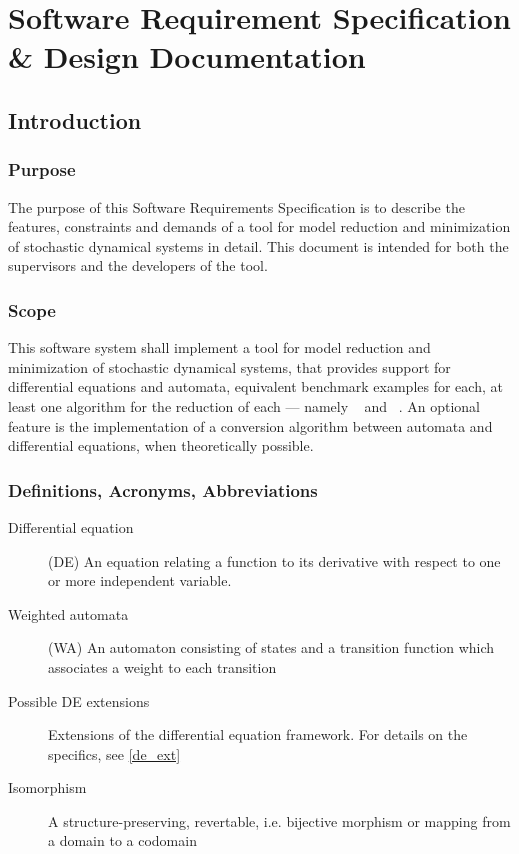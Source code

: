 \chapter{Software Requirement Specification \& Design Documentation}
    \section{Introduction}
        \subsection{Purpose}
                The purpose of this Software Requirements Specification is to describe the features, constraints and demands of a tool for model reduction and minimization of stochastic dynamical systems in detail. This document is intended for both the supervisors and the developers of the tool.
        \subsection{Scope}
                This software system shall implement a tool for model reduction and minimization of stochastic dynamical systems, that provides support for differential equations and automata, equivalent benchmark examples for each, at least one algorithm for the reduction of each --- namely ~\autocite{Kiefer2013OnTC} and ~\autocite{Cardelli2017MaximalAO}. An optional feature is the implementation of a conversion algorithm between automata and differential equations, when theoretically possible.

        \subsection{Definitions, Acronyms, Abbreviations}
        \begin{description}
         \item[Differential equation] (DE) An equation relating a function to its derivative with respect to one or more independent variable. \\
         \item[Weighted automata] (WA) An automaton consisting of states and a transition function which associates a weight to each transition \\
         \item[Possible DE extensions] Extensions of the differential equation framework. For details on the specifics, see \cref{de_ext} \\
         \item[Isomorphism] A structure-preserving, revertable, i.e. bijective morphism or mapping from a domain to a codomain
        \end{description}       
        
